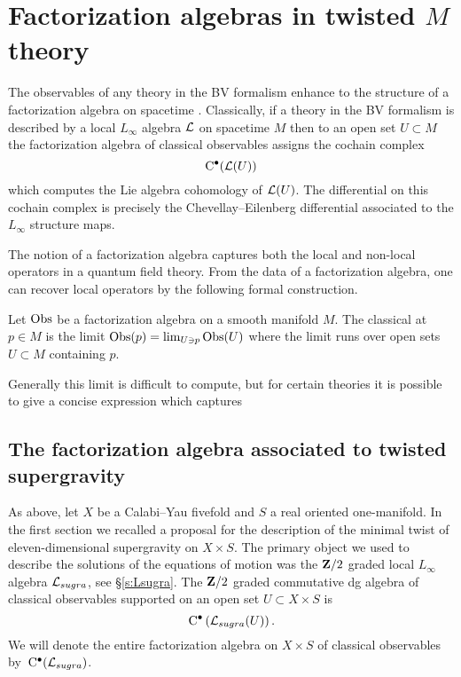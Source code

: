 \documentclass[11pt]{amsart}
\begin{document}
\section{Factorization algebras in twisted $M$ theory}

The observables of any theory in the BV formalism enhance to the structure of a factorization algebra on spacetime \cite{CG2}. 
Classically, if a theory in the BV formalism is described by a local $L_\infty$ algebra $\mathcal L$ on spacetime $M$ then to an open set $U \subset M$ the factorization algebra of classical observables assigns the cochain complex
\[
{\rm C}^\bullet(\mathcal L(U))
\]
which computes the Lie algebra cohomology of $\mathcal L(U)$. 
The differential on this cochain complex is precisely the Chevellay--Eilenberg differential associated to the $L_\infty$ structure maps. 

The notion of a factorization algebra captures both the local and non-local operators in a quantum field theory. 
From the data of a factorization algebra, one can recover local operators by the following formal construction. 

\begin{dfn} 
Let $\operatorname{Obs}$ be a factorization algebra on a smooth manifold $M$.
The classical  at $p \in M$ is the limit $\operatorname{Obs}(p) = \lim_{U \ni p} \operatorname{Obs}(U)$ where the limit runs over open sets $U \subset M$ containing $p$.
\end{dfn}

Generally this limit is difficult to compute, but for certain theories it is possible to give a concise expression which captures 

\subsection{The factorization algebra associated to twisted supergravity}

\parsec[s:sugraobs]

As above, let $X$ be a Calabi--Yau fivefold and $S$ a real oriented one-manifold. 
In the first section we recalled a proposal for the description of the minimal twist of eleven-dimensional supergravity on $X \times S$. 
The primary object we used to describe the solutions of the equations of motion was the $\mathbf{Z}/2$ graded local $L_\infty$ algebra $\mathcal L_{sugra}$, see \S \ref{s:Lsugra}. 
The $\mathbf{Z}/2$ graded commutative dg algebra of classical observables supported on an open set $U \subset X \times S$ is 
\[
{\rm C}^\bullet\left(\mathcal L_{sugra}(U)\right) .
\]
We will denote the entire factorization algebra on $X \times S$ of classical observables by~${\rm C}^\bullet(\mathcal L_{sugra})$. 
\end{document}
